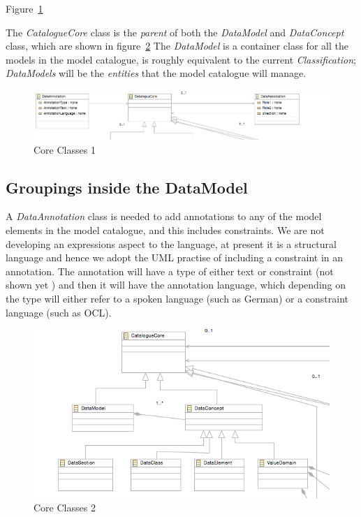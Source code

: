 \documentclass{article}
\begin{document}
Figure~\ref{fig:core1} 



The \emph{CatalogueCore} class is the \emph{parent} of both the \emph{DataModel} and \emph{DataConcept} class, which are shown in figure~\ref{fig:core2} The \emph{DataModel} is a container class for all the models in the model catalogue, is roughly equivalent to the current \emph{Classification};  \emph{DataModels} will be the \emph{entities} that the model catalogue will manage.

 \begin{figure}[here]
\includegraphics[scale=0.4]{images/core1}
\caption{Core Classes 1} 
\label{fig:core1}
\end{figure}

\subsection{Groupings inside the DataModel}

A \emph{DataAnnotation} class is needed to add annotations to any of the model elements in the model catalogue, and this includes constraints. We are not developing an expressions aspect to the language, at present it is a structural language and hence we adopt the UML practise of including a constraint in an annotation. The annotation will have a type of either text or constraint (not shown yet ) and then it will have the annotation language, which depending on the type will either refer to a spoken language (such as German) or a constraint language (such as OCL).

\begin{figure}[here]
\includegraphics[scale=0.4]{images/core2}
\caption{Core Classes 2} 
\label{fig:core2}
\end{figure}
\end{document}
